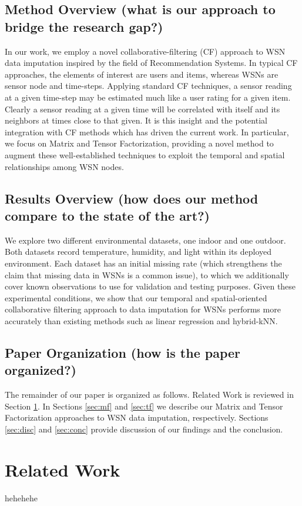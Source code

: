 \documentclass[10pt]{sigplan-proc-varsize-sensys11}
\begin{document}
\subsection{Method Overview (what is our approach to bridge the research gap?)}
In our work, we employ a novel collaborative-filtering (CF) approach to WSN data imputation inspired by the field of Recommendation Systems.
In typical CF approaches, the elements of interest are users and items, whereas WSNs are sensor node and time-steps.
Applying standard CF techniques, a sensor reading at a given time-step may be estimated much like a user rating for a given item.
Clearly a sensor reading at a given time will be correlated with itself and its neighbors at times close to that given.
It is this insight and the potential integration with CF methods which has driven the current work.
In particular, we focus on Matrix and Tensor Factorization, providing a novel method to augment these well-established techniques to exploit the temporal and spatial relationships among WSN nodes.

\subsection{Results Overview (how does our method compare to the state of the art?)}
We explore two different environmental datasets, one indoor and one outdoor.
Both datasets record temperature, humidity, and light within its deployed environment.
Each dataset has an initial missing rate (which strengthens the claim that missing data in WSNs is a common issue), to which we additionally cover known observations to use for validation and testing purposes.
Given these experimental conditions, we show that our temporal and spatial-oriented collaborative filtering approach to data imputation for WSNs performs more accurately than existing methods such as linear regression and hybrid-kNN.

\subsection{Paper Organization (how is the paper organized?)}
The remainder of our paper is organized as follows.
Related Work is reviewed in Section \ref{sec:rw}.
In Sections \ref{sec:mf} and \ref{sec:tf} we describe our Matrix and Tensor Factorization approaches to WSN data imputation, respectively.
Sections \ref{sec:disc} and \ref{sec:conc} provide discussion of our findings and the conclusion.

\section{Related Work} \label{sec:rw}
hehehehe
\end{document}
